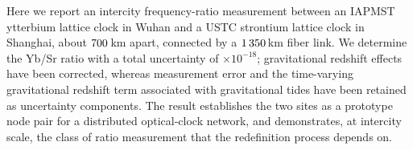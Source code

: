 Here we report an intercity frequency-ratio measurement
between an IAPMST ytterbium lattice clock in Wuhan and a USTC strontium
lattice clock in Shanghai, about $700$\,km apart, connected by a
$1\thinspace350$\,km fiber link. We determine the Yb/Sr ratio with a total
uncertainty of \uTotalE$\times10^{-18}$; gravitational redshift
effects have been corrected, whereas measurement error and the
time-varying gravitational redshift term associated with gravitational
tides have been retained as uncertainty components. The result
establishes the two sites as a prototype node pair for a distributed
optical-clock network, and demonstrates, at intercity scale, the
class of ratio measurement that the redefinition process depends on.

